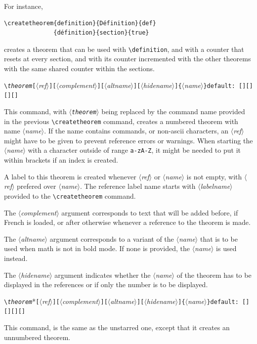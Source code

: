 \documentclass[12pt, babellanguage=british, titlespace, defaulttheorems]{altarticle}
\newcommand{\aargt}[1]{\ensuremath{\langle}\textrm{{\emph{#1}}}\ensuremath{\rangle}}
\newcommand{\argt}[1]{\texttt{\{}\ensuremath{\langle}\textrm{{\emph{#1}}}\ensuremath{\rangle}\texttt{\}}}
\newcommand{\optargt}[1]{\texttt{[}\ensuremath{\langle}\textrm{\emph{#1}}\ensuremath{\rangle}\texttt{]}}
\newcommand{\commandline}[1][]{\def\argI{#1}\ccommandline}
\newcommand{\ccommandline}[2][]{\par\medskip\hspace*{-.75cm}\texttt{\textbackslash#2}\argI{}\hfill\if\relax\detokenize{#1}\relax\else\texttt{default:~#1}\fi\par}
\begin{document}
For instance,
\begin{verbatim}
\createtheorem{definition}{Définition}{def}
              {définition}{section}{true}
\end{verbatim}
creates a theorem that can be used with \texttt{\textbackslash definition}, and with a counter that resets at every section, and with its counter incremented with the other theorems with the same shared counter within the sections.
\commandline[\optargt{ref}\optargt{complement}\optargt{altname}\optargt{hidename}\argt{name}][{[][][][]}]{\emph{theorem}}
This command, with \texttt{\aargt{theorem}} being replaced by the command name provided in the previous \texttt{\textbackslash createtheorem} command, creates a numbered theorem with name \aargt{name}. If the name contains commands, or non-ascii characters, an \aargt{ref} might have to be given to prevent reference errors or warnings. When starting the \aargt{name} with a character outside of range \texttt{a-zA-Z}, it might be needed to put it within brackets if an index is created.

A label to this theorem is created whenever \aargt{ref} or \aargt{name} is not empty, with \aargt{ref} prefered over \aargt{name}. The reference label name starts with \aargt{labelname} provided to the \texttt{\textbackslash createtheorem} command.

The \aargt{complement} argument corresponds to text that will be added before, if French is loaded, or after otherwise whenever a reference to the theorem is made.

The \aargt{altname} argument corresponds to a variant of the \aargt{name} that is to be used when math is not in bold mode. If none is provided, the \aargt{name} is used instead.

The \aargt{hidename} argument indicates whether the \aargt{name} of the theorem has to be displayed in the references or if only the number is to be displayed.
\commandline[*\optargt{ref}\optargt{complement}\optargt{altname}\optargt{hidename}\argt{name}][{[][][][]}]{\emph{theorem}}
This command, is the same as the unstarred one, except that it creates an unnumbered theorem.
\end{document}
